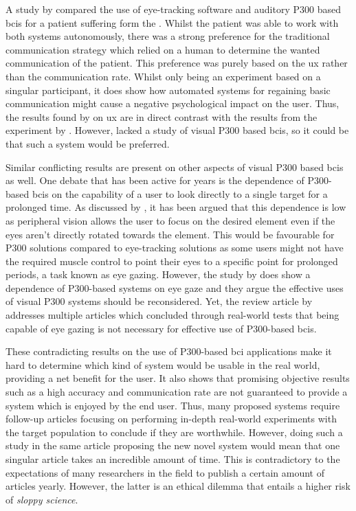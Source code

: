 A study by \citet{no_interest_in_using_p300} compared the use of eye-tracking software and auditory P300 based \glspl{bci} for a patient suffering form the .
Whilst the patient was able to work with both systems autonomously, there was a strong preference for the traditional communication strategy which relied on a human to determine the wanted communication of the patient.
This preference was purely based on the \gls{ux} rather than the communication rate.
Whilst only being an experiment based on a singular participant, it does show how automated systems for regaining basic communication might cause a negative psychological impact on the user.
Thus, the results found by \citet{eye_tracking_vs_p300_comparable} on \gls{ux} are in direct contrast with the results from the experiment by \citet{no_interest_in_using_p300}.
However, \citet{no_interest_in_using_p300} lacked a study of visual P300 based \glspl{bci}, so it could be that such a system would be preferred. 

Similar conflicting results are present on other aspects of visual P300 based \glspl{bci} as well.
One debate that has been active for years is the dependence of P300-based \glspl{bci} on the capability of a user to look directly to a single target for a prolonged time.
As discussed by \citet{p300_eye_gaze}, it has been argued that this dependence is low as peripheral vision allows the user to focus on the desired element even if the eyes aren't directly rotated towards the element.
This would be favourable for P300 solutions compared to eye-tracking solutions as some users might not have the required muscle control to point their eyes to a specific point for prolonged periods, a task known as eye gazing.
However, the study by \citet{p300_eye_gaze} does show a dependence of P300-based systems on eye gaze and they argue the effective uses of visual P300 systems should be reconsidered.
Yet, the review article by \citet{bci_eye_gaze} addresses multiple articles which concluded through real-world tests that being capable of eye gazing is not necessary for effective use of P300-based \glspl{bci}.

These contradicting results on the use of P300-based \gls{bci} applications make it hard to determine which kind of system would be usable in the real world, providing a net benefit for the user.
It also shows that promising objective results such as a high accuracy and communication rate are not guaranteed to provide a system which is enjoyed by the end user.
Thus, many proposed systems require follow-up articles focusing on performing in-depth real-world experiments with the target population to conclude if they are worthwhile.
However, doing such a study in the same article proposing the new novel system would mean that one singular article takes an incredible amount of time.
This is contradictory to the expectations of many researchers in the field to publish a certain amount of articles yearly.
However, the latter is an ethical dilemma that entails a higher risk of \textit{sloppy science}.

